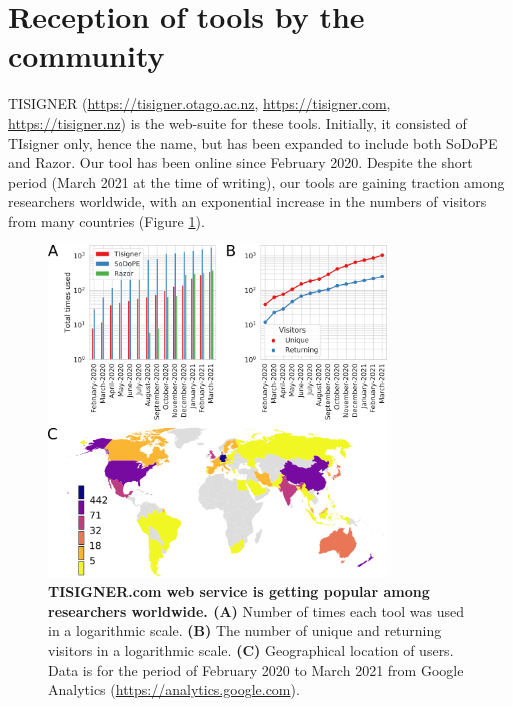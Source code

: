 \section{Reception of tools by the community}
TISIGNER (\href{https://tisigner.otago.ac.nz}{https://tisigner.otago.ac.nz}, \href{https://tisigner.com}{https://tisigner.com}, \href{https://tisigner.nz}{https://tisigner.nz}) is the web-suite for these tools. Initially, it consisted of TIsigner only, hence the name, but has been expanded to include both SoDoPE and Razor. Our tool has been online since February 2020. Despite the short period (March 2021 at the time of writing), our tools are gaining traction among researchers worldwide, with an exponential increase in the numbers of visitors from many countries (Figure \ref{fig:tisigner_stats}).


\begin{figure}[H]
\center
\includegraphics[width=0.8\textwidth]{chapters/Discussion/Figures/tisigner_stats.png}
\caption[TISIGNER.com web service is getting popular among researchers worldwide.]{\textbf{TISIGNER.com web service is getting popular among researchers worldwide. (A)} Number of times each tool was used in a logarithmic scale. \textbf{(B)} The number of unique and returning visitors in a logarithmic scale. \textbf{(C)} Geographical location of users. Data is for the period of February 2020 to March 2021 from Google Analytics (\href{https://analytics.google.com}{https://analytics.google.com}). }%
\label{fig:tisigner_stats}
\end{figure}


